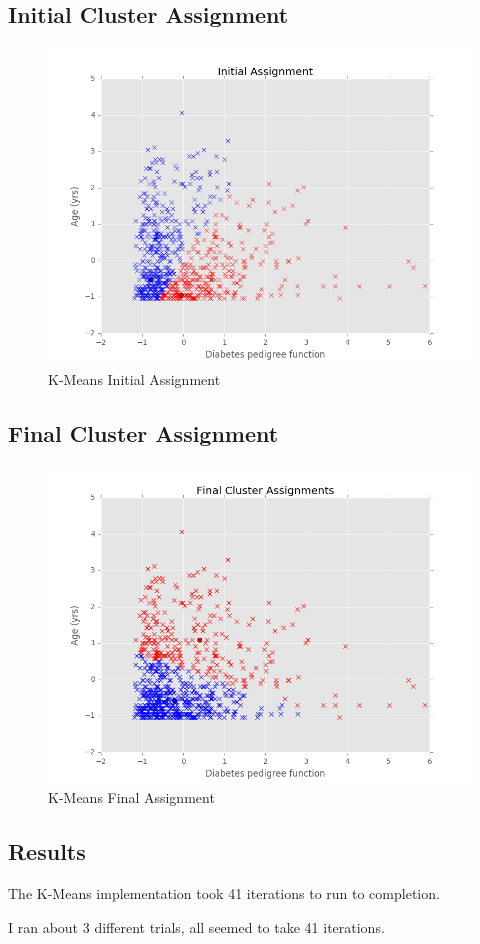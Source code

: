\documentclass[12pt]{article}
\begin{document}
\subsection*{Initial Cluster Assignment}
\begin{figure}[H]
\begin{center}
\includegraphics[scale=0.85]{InitialAssignment.png}
\caption{K-Means Initial Assignment}
\end{center}
\end{figure}
\subsection*{Final Cluster Assignment}
\begin{figure}[H]
\begin{center}
\includegraphics[scale=0.85]{FinalAssignment.png}
\caption{K-Means Final Assignment}
\end{center}
\end{figure}
\subsection*{Results}
The K-Means implementation took 41 iterations to run to completion.

I ran about 3 different trials, all seemed to take 41 iterations.
\end{document}
